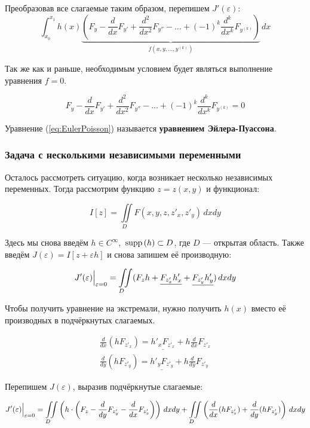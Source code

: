 \documentclass[12pt]{article}
\begin{document}
			Преобразовав все слагаемые таким образом, перепишем $J'(\varepsilon)$:
			$$\int_{x_0}^{x_1} h(x)
				\underbrace{\left(F_y - \frac{d}{dx}F_{y'} + \frac{d^2}{dx^2}F_{y''} - 
				\ldots + (-1)^k\frac{d^k}{dx^k}F_{y^{(k)}}\right)}_{f(x, y, \ldots, y^{(k)})} \,dx$$

			Так же как и раньше, необходимым условием будет являться выполнение уравнения $f = 0$.
	
			\begin{equation} \label{eq:EulerPoisson}
				F_y - \frac{d}{dx}F_{y'} + \frac{d^2}{dx^2}F_{y''} - 
				\ldots + (-1)^k\frac{d^k}{dx^k}F_{y^{(k)}} = 0
			\end{equation}
	
			Уравнение (\ref{eq:EulerPoisson}) называется \textbf{уравнением Эйлера-Пуассона}.

		\subsubsection{Задача с несколькими независимыми переменными}

			Осталось рассмотреть ситуацию, когда возникает несколько независимых переменных. Тогда рассмотрим
			функцию $z = z(x,y)$ и функционал:

			$$I[z] = \underset{D\hspace{10pt}}{\iint} F(x, y, z, z'_x, z'_y) \,dxdy$$
	
			Здесь мы снова введём $h \in C^{\infty}$, $\,\text{supp}\,(h) \subset D$, где $D$ --- открытая область.
			Также введём $J(\varepsilon) = I[z + \varepsilon h]$ и снова запишем её производную:

			$$J'(\varepsilon)\Big|_{\varepsilon = 0}^{} = 
	  		\underset{D\hspace{10pt}}{\iint} (F_zh + \underline{F_{z'_x}h'_x} + \underline{F_{z'_y}h'_y}) \,dxdy$$

			Чтобы получить уравнение на экстремали, нужно получить $h(x)$ вместо её производных в
			подчёркнутых слагаемых.
	
			\begin{align*}
				\frac{d}{dx}(h F_{z'_x}) = \underline{h'_xF_{z'_x}} + h\frac{d}{dx}F_{z'_x} \\
				\frac{d}{dy}(h F_{z'_y}) = \underline{h'_yF_{z'_y}} + h\frac{d}{dy}F_{z'_y}
			\end{align*}

			Перепишем $J(\varepsilon)$, выразив подчёркнутые слагаемые:
	
			$$
				J'(\varepsilon)\Big|_{\varepsilon = 0}^{} = 
				\underset{D\hspace{10pt}}{\iint} \left( h\cdot\left(F_z - \frac{d}{dy}F_{z'_y} - \frac{d}{dx}F_{z'_x}\right) \right) \,dxdy
				+ \underset{D\hspace{10pt}}{\iint} \left(\frac{d}{dx}(hF_{z'_x}) + \frac{d}{dy}(hF_{z'_y}) \right) \,dxdy
			$$
\end{document}
